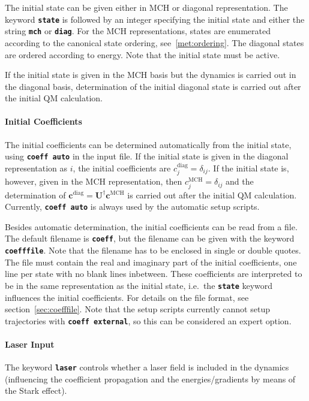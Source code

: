 \documentclass[a4paper,10pt,DIV=15,openany,twoside=false]{scrbook}
\newcommand{\ttt}[1]{\textbf{\texttt{#1}}}
\newcommand{\VEC}[1]{\ensuremath{\mathbf{#1}}}
\begin{document}
The initial state can be given either in MCH or diagonal representation. The keyword \ttt{state} is followed by an integer specifying the initial state and either the string \ttt{mch} or \ttt{diag}. For the MCH representations, states are enumerated according to the canonical state ordering, see~\ref{met:ordering}. The diagonal states are ordered according to energy. Note that the initial state must be active. 

If the initial state is given in the MCH basis but the dynamics is carried out in the diagonal basis, determination of the initial diagonal state is carried out after the initial QM calculation.

\paragraph{Initial Coefficients}

The initial coefficients can be determined automatically from the initial state, using \ttt{coeff auto} in the input file. If the initial state is given in the diagonal representation as $i$, the initial coefficients are $c^{\text{diag}}_j=\delta_{ij}$. If the initial state is, however, given in the MCH representation, then $c^{\text{MCH}}_j=\delta_{ij}$ and the determination of $\VEC{c}^{\text{diag}}=\VEC{U}^\dagger\VEC{c}^{\text{MCH}}$ is carried out after the initial QM calculation. 
Currently, \ttt{coeff auto} is always used by the automatic setup scripts.

Besides automatic determination, the initial coefficients can be read from a file. The default filename is \ttt{coeff}, but the filename can be given with the keyword \ttt{coefffile}. Note that the filename has to be enclosed in single or double quotes. The file must contain the real and imaginary part of the initial coefficients, one line per state with no blank lines inbetween. These coefficients are interpreted to be in the same representation as the initial state, i.e.\ the \ttt{state} keyword influences the initial coefficients. For details on the file format, see section~\ref{sec:coefffile}.
Note that the setup scripts currently cannot setup trajectories with \ttt{coeff external}, so this can be considered an expert option.

\paragraph{Laser Input}

The keyword \ttt{laser} controls whether a laser field is included in the dynamics (influencing the coefficient propagation and the energies/gradients by means of the Stark effect). 
\end{document}
